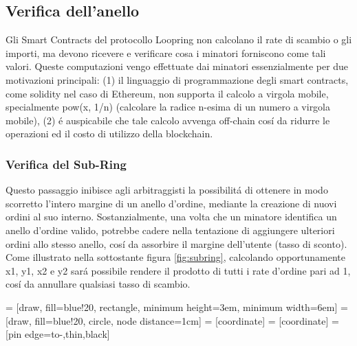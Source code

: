 \documentclass[UTF8,nofonts]{article}
\makeatletter
\newenvironment{figurehere}
 {\def\@captype{figure}}
 {}
\makeatother
\begin{document}
\begin{multicols}{2}
\subsection{Verifica dell'anello\label{sec:ring_verification}}

Gli Smart  Contracts  del protocollo Loopring non calcolano il rate di scambio o gli  importi, ma devono ricevere e verificare cosa i minatori forniscono come tali valori. Queste computazioni vengo effettuate dai minatori essenzialmente per due motivazioni principali: (1) il linguaggio di programmazione degli smart contracts, come solidity\cite{dannen2017introducing} nel caso di Ethereum, non supporta il calcolo a virgola mobile, specialmente  pow(x, 1/n)  (calcolare la radice n-esima di un numero a  virgola mobile), (2)  \'e auspicabile che tale calcolo avvenga off-chain cos\'i da ridurre le operazioni ed il costo di utilizzo della blockchain.


\subsubsection{Verifica del Sub-Ring\label{sec:sub_ring_check}}
Questo passaggio inibisce agli arbitraggisti la possibilit\'a di ottenere in modo scorretto l'intero margine di un anello d'ordine, mediante la creazione di nuovi ordini al suo interno. Sostanzialmente, una volta che un minatore identifica un anello d'ordine valido, potrebbe cadere nella tentazione di aggiungere ulteriori ordini allo stesso anello, cos\'i da assorbire il margine dell'utente (tasso di sconto). Come illustrato nella sottostante figura \ref{fig:subring}, calcolando opportunamente x1, y1, x2 e y2 sar\'a possibile rendere il prodotto di tutti i rate d'ordine pari ad 1, cos\'i da annullare qualsiasi tasso di scambio.

\begin{center}
\begin{figurehere}
\centering
{} = [draw, fill=blue!20, rectangle,
    minimum height=3em, minimum width=6em]
 = [draw, fill=blue!20, circle, node distance=1cm]
 = [coordinate]
 = [coordinate]
 = [pin edge={to-,thin,black}]

\begin{tikzpicture}[
    auto,
    node distance=2cm,
    >=latex',
    font=\bfseries\footnotesize\sffamily,
    order/.style={
		scale=0.7,
		rectangle,
		rounded corners,
		draw=black,
		text centered,
		minimum height=12mm,
		fill=white
	},
	label/.style={
		scale=0.7
	}
  ]


\end{tikzpicture}
\end{figurehere}
\end{center}
\end{multicols}
\end{document}
